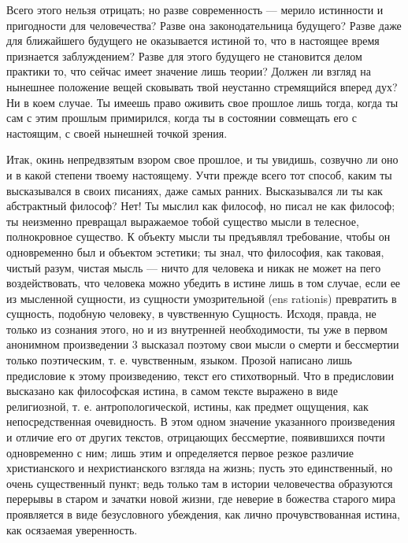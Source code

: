 \documentclass[12pt]{article}
\begin{document}
Всего этого нельзя отрицать; но разве  
современность --- мерило истинности и пригодности для  
человечества? Разве она законодательница будущего? Разве 
даже для ближайшего будущего не оказывается  
истиной то, что в настоящее время признается  
заблуждением? Разве для этого будущего не становится делом 
практики то, что сейчас имеет значение лишь теории? 
Должен ли взгляд на нынешнее положение вещей  
сковывать твой неустанно стремящийся вперед дух? Ни 
в коем случае. Ты имеешь право оживить свое прошлое 
лишь тогда, когда ты сам с этим прошлым примирился, 
когда ты в состоянии совмещать его с настоящим, с 
своей нынешней точкой зрения.

Итак, окинь непредвзятым взором свое прошлое, и 
ты увидишь, созвучно ли оно и в какой степени твоему 
настоящему. Учти прежде всего тот способ, каким ты 
высказывался в своих писаниях, даже самых ранних. 
Высказывался ли ты как абстрактный философ? Нет! 
Ты мыслил как философ, но писал не как философ; 
ты неизменно превращал выражаемое тобой существо 
мысли в телесное, полнокровное существо. К объекту 
мысли ты предъявлял требование, чтобы он  
одновременно был и объектом эстетики; ты знал, что  
философия, как таковая, чистый разум, чистая мысль --- ничто 
для человека и никак не может на пего воздействовать, 
что человека можно убедить в истине лишь в том  
случае, если ее из мысленной сущности, из сущности  
умозрительной (ens rationis) превратить в сущность,  
подобную человеку, в чувственную Сущность. Исходя, правда, не только из сознания этого, но и из  
внутренней необходимости, ты уже в первом анонимном  
произведении 3 высказал поэтому свои мысли о смерти и бессмертии только поэтическим, т. е. чувственным,  
языком. Прозой написано лишь предисловие к этому  
произведению, текст его стихотворный. Что в предисловии 
высказано как философская истина, в самом тексте  
выражено в виде религиозной, т. е. антропологической, 
истины, как предмет ощущения, как непосредственная 
очевидность. В этом одном значение указанного  
произведения и отличие его от других текстов, отрицающих 
бессмертие, появившихся почти одновременно с ним; 
лишь этим и определяется первое резкое различие  
христианского и нехристианского взгляда на жизнь; 
пусть это единственный, но очень существенный пункт; 
ведь только там в истории человечества образуются  
перерывы в старом и зачатки новой жизни, где неверие в божества старого мира проявляется в виде безусловного 
убеждения, как лично прочувствованная истина, как 
осязаемая уверенность.
\end{document}
